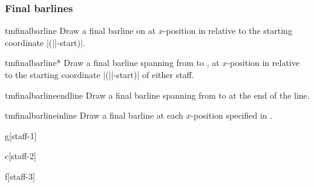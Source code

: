 \documentclass[11pt,a4paper]{ltxdoc}
\begin{document}
\subsubsection{Final barlines}\label{sec:multistaff:barlines:final}
\begin{docCommand}{tmfinalbarline}{}
  Draw a final barline on  at $x$-position  in 
  relative to the starting coordinate |(||-start)|.
\end{docCommand}
\begin{docCommand}{tmfinalbarline*}{}
  Draw a final barline spanning from  to 
  , at $x$-position  in relative to 
  the starting coordinate |(||-start)| of either staff.
\end{docCommand}
\begin{docCommand}{tmfinalbarlineendline}{}
  Draw a final barline spanning from  to 
   at the end of the line.
\end{docCommand}
\begin{docCommand}{tmfinalbarlineinline}{}
  Draw a final barline at each $x$-position specified in .
\end{docCommand}
\begin{dispExample}
\begin{tmmultiplestaves}[0pt]%
  \begin{tmstaff}{g}[staff-1]
  \end{tmstaff}%
  \begin{tmstaff}{c}[staff-2]
  \end{tmstaff}%
  \begin{tmstaff}{f}[staff-3]
  \end{tmstaff}%
\end{tmmultiplestaves}
\end{dispExample}
\end{document}
